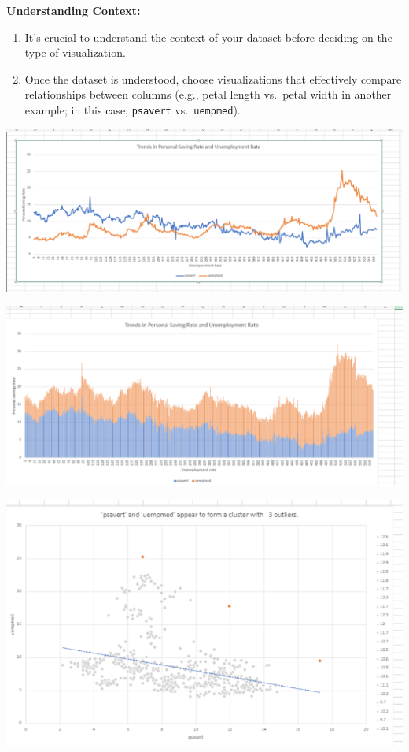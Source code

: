\documentclass[
  letterpaper,
  DIV=11,
  numbers=noendperiod]{scrreprt}
\begin{document}
\textbf{Understanding Context:}

\begin{enumerate}
\def\labelenumi{\arabic{enumi}.}
\item
  It's crucial to understand the context of your dataset before deciding
  on the type of visualization.
\item
  Once the dataset is understood, choose visualizations that effectively
  compare relationships between columns (e.g., petal length vs.~petal
  width in another example; in this case, \texttt{psavert}
  vs.~\texttt{uempmed}).
\end{enumerate}

\includegraphics{./Excel_1_Unit/Week1_Samuel/Screenshot(355).png}

\includegraphics{./Excel_1_Unit/Week1_Samuel/Screenshot(356).png}

\includegraphics{./Excel_1_Unit/Week1_Samuel/Screenshot(360).png}
\end{document}
